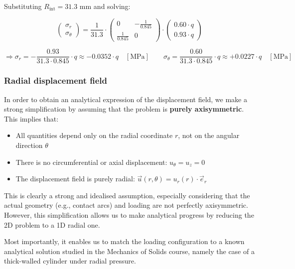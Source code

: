 \documentclass[12pt]{article}
\begin{document}
Substituting $R_{\text{int}} = 31.3$ mm and solving:

\[
\begin{pmatrix}
\sigma_r \\
\sigma_\theta
\end{pmatrix}
=
\frac{1}{31.3}
\cdot
\begin{pmatrix}
0 & -\frac{1}{0.845} \\
\frac{1}{0.845} & 0
\end{pmatrix}
\cdot
\begin{pmatrix}
0.60 \cdot q \\
0.93 \cdot q
\end{pmatrix}
\]

\[
\Rightarrow
\sigma_r = -\frac{0.93}{31.3 \cdot 0.845} \cdot q \approx \boxed{-0.0352 \cdot q} \quad [\text{MPa}]
\qquad
\sigma_\theta = \frac{0.60}{31.3 \cdot 0.845} \cdot q \approx \boxed{+0.0227 \cdot q} \quad [\text{MPa}]
\]

\subsubsection{Radial displacement field}

In order to obtain an analytical expression of the displacement field, we make a strong simplification by assuming that the problem is \textbf{purely axisymmetric}. This implies that:

\begin{itemize}
    \item All quantities depend only on the radial coordinate \( r \), not on the angular direction \( \theta \)
    \item There is no circumferential or axial displacement: \( u_\theta = u_z = 0 \)
    \item The displacement field is purely radial: \( \vec{u}(r, \theta) = u_r(r) \cdot \vec{e}_r \)
\end{itemize}

\vspace{0.5em}

This is clearly a strong and idealised assumption, especially considering that the actual geometry (e.g., contact arcs) and loading are not perfectly axisymmetric. However, this simplification allows us to make analytical progress by reducing the 2D problem to a 1D radial one. 

Most importantly, it enables us to match the loading configuration to a known analytical solution studied in the Mechanics of Solids course, namely the case of a thick-walled cylinder under radial pressure.
\end{document}
